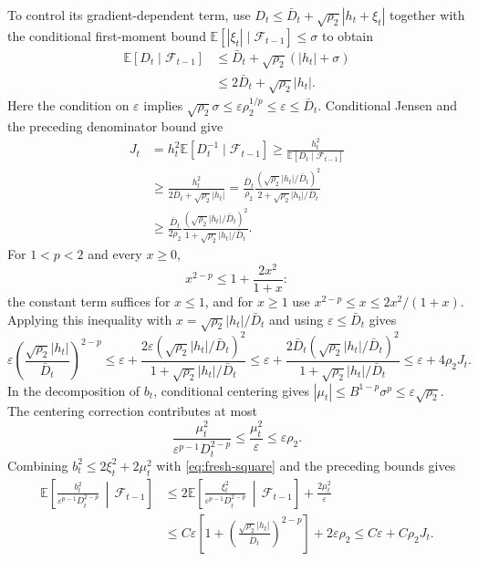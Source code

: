 \documentclass[11pt,letterpaper]{article}
\theoremstyle{definition}
\newcommand{\E}{\mathbb E}
\newcommand{\F}{\mathcal F}
\newcommand{\eps}{\varepsilon}
\begin{document}
To control its gradient-dependent term, use
$D_t\le \bar D_t+\sqrt{\rho_2}|h_t+\xi_t|$ together with the conditional
first-moment bound $\E[|\xi_t|\mid\F_{t-1}]\le\sigma$ to obtain
\begin{align*}
\E[D_t\mid\F_{t-1}]
&\le \bar D_t+\sqrt{\rho_2}(|h_t|+\sigma)\\
&\le2\bar D_t+\sqrt{\rho_2}|h_t|.
\end{align*}
Here the condition on $\eps$ implies
$\sqrt{\rho_2}\sigma\le\eps\rho_2^{1/p}\le\eps\le \bar D_t$.
Conditional Jensen and the preceding denominator bound give
\begin{equation}
\begin{aligned}
J_t&=h_t^2\E[D_t^{-1}\mid\F_{t-1}]
\ge\frac{h_t^2}{\E[D_t\mid\F_{t-1}]}\\
&\ge\frac{h_t^2}{2\bar D_t+\sqrt{\rho_2}|h_t|}
=\frac{\bar D_t}{\rho_2}
\frac{(\sqrt{\rho_2}|h_t|/\bar D_t)^2}
{2+\sqrt{\rho_2}|h_t|/\bar D_t}\\
&\ge\frac{\bar D_t}{2\rho_2}
\frac{(\sqrt{\rho_2}|h_t|/\bar D_t)^2}
{1+\sqrt{\rho_2}|h_t|/\bar D_t}.
\end{aligned}
\label{eq:normalized-gradient-lower}
\end{equation}
For $1<p<2$ and every $x\ge0$,
\[
x^{2-p}\le1+\frac{2x^2}{1+x}:
\]
the constant term suffices for $x\le1$, and for $x\ge1$ use
$x^{2-p}\le x\le2x^2/(1+x)$. Applying this inequality with
$x=\sqrt{\rho_2}|h_t|/\bar D_t$ and using $\eps\le\bar D_t$ gives
\[
\eps\left(\frac{\sqrt{\rho_2}|h_t|}{\bar D_t}\right)^{2-p}
\le\eps+
\frac{2\eps(\sqrt{\rho_2}|h_t|/\bar D_t)^2}
{1+\sqrt{\rho_2}|h_t|/\bar D_t}
\le\eps+
\frac{2\bar D_t(\sqrt{\rho_2}|h_t|/\bar D_t)^2}
{1+\sqrt{\rho_2}|h_t|/\bar D_t}
\le\eps+4\rho_2J_t.
\]
In the decomposition of $b_t$, conditional centering gives
$|\mu_t|\le B^{1-p}\sigma^p\le\eps\sqrt{\rho_2}$.
The centering correction contributes at most
\[
\frac{\mu_t^2}{\eps^{p-1}D_t^{2-p}}
\le\frac{\mu_t^2}{\eps}\le\eps\rho_2.
\]
Combining $b_t^2\le2\xi_t^2+2\mu_t^2$ with
\eqref{eq:fresh-square} and the preceding bounds gives
\begin{equation}
\begin{aligned}
\E\left[\frac{b_t^2}{\eps^{p-1}D_t^{2-p}}
\,\middle|\,\F_{t-1}\right]
&\le2\E\left[\frac{\xi_t^2}{\eps^{p-1}D_t^{2-p}}
\,\middle|\,\F_{t-1}\right]+\frac{2\mu_t^2}{\eps}\\
&\le C\eps\left[1+
\left(\frac{\sqrt{\rho_2}|h_t|}{\bar D_t}\right)^{2-p}\right]
+2\eps\rho_2
\le C\eps+C\rho_2J_t.
\end{aligned}
\label{eq:large-noise-diagonal}
\end{equation}
\end{document}
